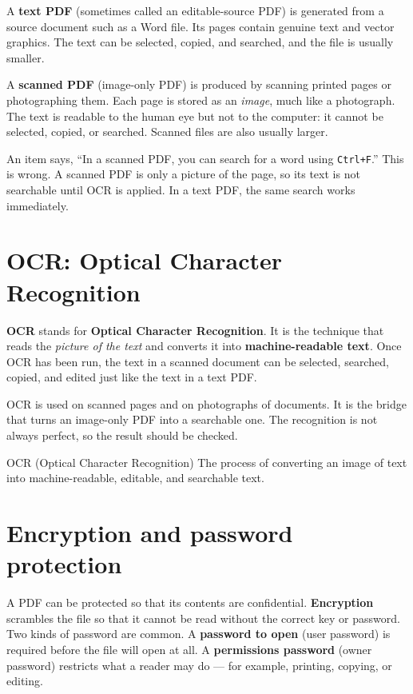 A \textbf{text PDF} (sometimes called an editable-source PDF) is generated
from a source document such as a Word file. Its pages contain genuine text and
vector graphics. The text can be selected, copied, and searched, and the file
is usually smaller.

A \textbf{scanned PDF} (image-only PDF) is produced by scanning printed pages
or photographing them. Each page is stored as an \emph{image}, much like a
photograph. The text is readable to the human eye but not to the computer: it
cannot be selected, copied, or searched. Scanned files are also usually
larger.

\begin{example}
An item says, ``In a scanned PDF, you can search for a word using
\texttt{Ctrl+F}.'' This is wrong. A scanned PDF is only a picture of the
page, so its text is not searchable until OCR is applied. In a text PDF, the
same search works immediately.
\end{example}

\section{OCR: Optical Character Recognition}
\textbf{OCR} stands for \textbf{Optical Character Recognition}. It is the
technique that reads the \emph{picture of the text} and converts it into
\textbf{machine-readable text}. Once OCR has been run, the text in a scanned
document can be selected, searched, copied, and edited just like the text in a
text PDF.

OCR is used on scanned pages and on photographs of documents. It is the
bridge that turns an image-only PDF into a searchable one. The recognition is
not always perfect, so the result should be checked.

\begin{definitionbox}{OCR (Optical Character Recognition)}
The process of converting an image of text into machine-readable, editable,
and searchable text.
\end{definitionbox}

\section{Encryption and password protection}
A PDF can be protected so that its contents are confidential.
\textbf{Encryption} scrambles the file so that it cannot be read without the
correct key or password. Two kinds of password are common. A \textbf{password
to open} (user password) is required before the file will open at all. A
\textbf{permissions password} (owner password) restricts what a reader may
do --- for example, printing, copying, or editing.

